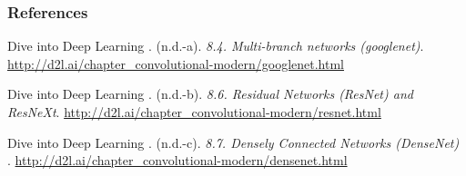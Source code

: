 
\begin{vbframe}
\frametitle{References}
\footnotesize{
\begin{thebibliography}{99}

 Dive into Deep Learning . (n.d.-a). \textit{8.4. Multi-branch networks (googlenet)}. \url{http://d2l.ai/chapter_convolutional-modern/googlenet.html}

 Dive into Deep Learning . (n.d.-b). \textit{8.6. Residual Networks (ResNet) and ResNeXt}. \url{http://d2l.ai/chapter_convolutional-modern/resnet.html}

 Dive into Deep Learning . (n.d.-c). \textit{8.7. Densely Connected Networks (DenseNet)
}. \url{http://d2l.ai/chapter_convolutional-modern/densenet.html}


\end{thebibliography}}
\end{vbframe}
